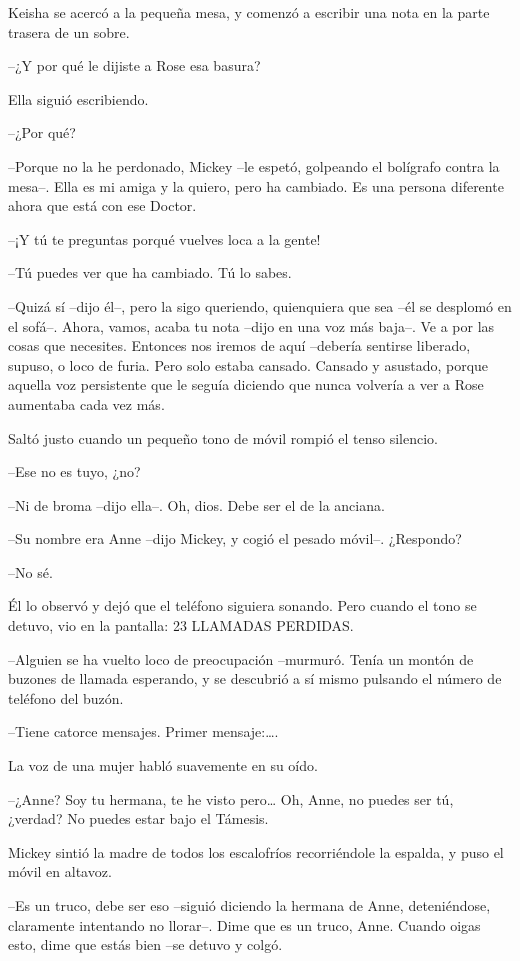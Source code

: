 {Keisha se acercó a la pequeña mesa, y comenzó a escribir una nota en la
parte trasera de un sobre.}

{--¿Y por qué le dijiste a Rose esa basura?}

{Ella siguió escribiendo.}

{--¿Por qué?}

{--Porque no la he perdonado, Mickey --le espetó, golpeando el bolígrafo
 contra la mesa--. Ella es mi amiga y la quiero, pero ha cambiado. Es una
persona diferente ahora que está con ese Doctor.}

{--¡Y tú te preguntas porqué vuelves loca a la gente!}

{--Tú puedes ver que ha cambiado. Tú lo sabes.}

{--Quizá sí --dijo él--, pero la sigo queriendo, quienquiera que sea
 --él se desplomó en el sofá--. Ahora, vamos, acaba tu nota --dijo en una
 voz más baja--. Ve a por las cosas que necesites. Entonces nos iremos de
 aquí --debería sentirse liberado, supuso, o loco de furia. Pero solo
 estaba cansado. Cansado y asustado, porque aquella voz persistente que
 le seguía diciendo que nunca volvería a ver a Rose aumentaba cada vez
más.}

{Saltó justo cuando un pequeño tono de móvil rompió el tenso silencio.}

{--Ese no es tuyo, ¿no?}

{--Ni de broma --dijo ella--. Oh, dios. Debe ser el de la anciana.}

{--Su nombre era Anne --dijo Mickey, y cogió el pesado móvil--.
¿Respondo?}

{--No sé.}

{Él lo observó y dejó que el teléfono siguiera sonando. Pero cuando el
tono se detuvo, vio en la pantalla: 23 LLAMADAS PERDIDAS.}

{--Alguien se ha vuelto loco de preocupación --murmuró. Tenía un montón
 de buzones de llamada esperando, y se descubrió a sí mismo pulsando el
número de teléfono del buzón.}

{--Tiene catorce mensajes. Primer mensaje:\ldots{}.}

{La voz de una mujer habló suavemente en su oído.}

{--¿Anne? Soy tu hermana, te he visto pero\ldots{} Oh, Anne, no puedes
ser tú, ¿verdad? No puedes estar bajo el Támesis.}

{Mickey sintió la madre de todos los escalofríos recorriéndole la
espalda, y puso el móvil en altavoz.}

{--Es un truco, debe ser eso --siguió diciendo la hermana de Anne,
 deteniéndose, claramente intentando no llorar--. Dime que es un truco,
Anne. Cuando oigas esto, dime que estás bien --se detuvo y colgó.}

